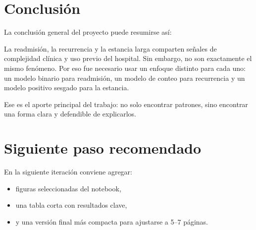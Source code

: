 \documentclass[12pt]{article}
\begin{document}
\section{Conclusión}

La conclusión general del proyecto puede resumirse así:

La readmisión, la recurrencia y la estancia larga comparten señales de complejidad clínica y uso previo del hospital. Sin embargo, no son exactamente el mismo fenómeno. Por eso fue necesario usar un enfoque distinto para cada uno: un modelo binario para readmisión, un modelo de conteo para recurrencia y un modelo positivo sesgado para la estancia.

Ese es el aporte principal del trabajo: no solo encontrar patrones, sino encontrar una forma clara y defendible de explicarlos.

\section*{Siguiente paso recomendado}

En la siguiente iteración conviene agregar:
\begin{itemize}[leftmargin=1.6em]
    \item figuras seleccionadas del notebook,
    \item una tabla corta con resultados clave,
    \item y una versión final más compacta para ajustarse a 5--7 páginas.
\end{itemize}
\end{document}
